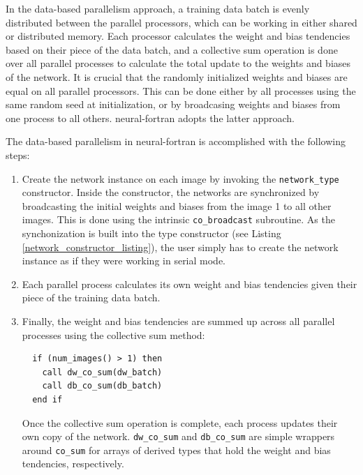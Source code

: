\documentclass[sigplan, review=false, screen=true, balance=true]{acmart}
\begin{document}
In the data-based parallelism approach, a training data batch is evenly distributed
between the parallel processors, which can be working in either
shared or distributed memory. Each processor calculates the weight and
bias tendencies based on their piece of the data batch, and a collective
sum operation is done over all parallel processes to calculate the
total update to the weights and biases of the network.
It is crucial that the randomly initialized weights and
biases are equal on all parallel processors.
This can be done either by all processes using the same random seed
at initialization, or by broadcasing weights and biases from one process to all
others. neural-fortran adopts the latter approach.

The data-based parallelism in neural-fortran is accomplished with the
following steps:

\begin{enumerate}

  \item Create the network instance on each image by invoking the
  \lstinline{network_type} constructor. Inside the constructor, the networks
  are synchronized by broadcasting the initial weights and biases from the
  image 1 to all other images. This is done using the intrinsic
  \lstinline{co_broadcast} subroutine. As the synchonization is built into the
  type constructor (see Listing \ref{network_constructor_listing}), the user
  simply has to create the network instance as if they were working in serial mode.

  \item Each parallel process calculates its own weight and bias tendencies given
  their piece of the training data batch.

  \item Finally, the weight and bias tendencies are summed up across all parallel
  processes using the collective sum method:

  \begin{minipage}{\linewidth}
  \begin{lstlisting}
  if (num_images() > 1) then
    call dw_co_sum(dw_batch)
    call db_co_sum(db_batch)
  end if
  \end{lstlisting}
  \end{minipage}

  Once the collective sum operation is complete, each process updates their
  own copy of the network. \lstinline{dw_co_sum} and \lstinline{db_co_sum} are
  simple wrappers around \lstinline{co_sum} for arrays of derived types that
  hold the weight and bias tendencies, respectively.

\end{enumerate}
\end{document}
